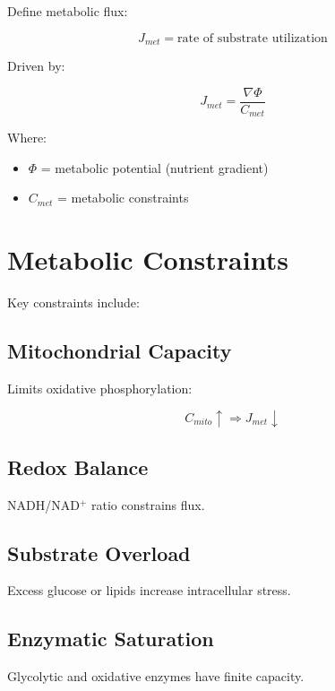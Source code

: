 \documentclass[12pt,a4paper]{article}
\begin{document}
Define metabolic flux:

\begin{equation}
J_{met} = \text{rate of substrate utilization}
\end{equation}

Driven by:

\begin{equation}
J_{met} = \frac{\nabla \Phi}{C_{met}}
\end{equation}

Where:

\begin{itemize}
    \item $\Phi$ = metabolic potential (nutrient gradient)
    \item $C_{met}$ = metabolic constraints
\end{itemize}

\section{Metabolic Constraints}

Key constraints include:

\subsection{Mitochondrial Capacity}

Limits oxidative phosphorylation:

\begin{equation}
C_{mito} \uparrow \Rightarrow J_{met} \downarrow
\end{equation}

\subsection{Redox Balance}

NADH/NAD$^+$ ratio constrains flux.

\subsection{Substrate Overload}

Excess glucose or lipids increase intracellular stress.

\subsection{Enzymatic Saturation}

Glycolytic and oxidative enzymes have finite capacity.
\end{document}
